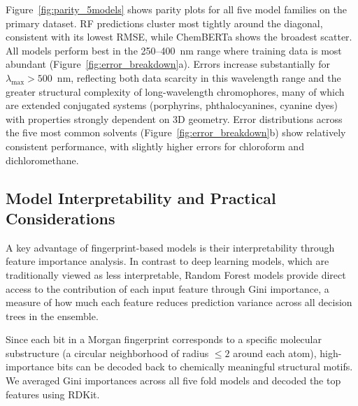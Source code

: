 Figure~\ref{fig:parity_5models} shows parity plots for all five model families on the primary dataset.
RF predictions cluster most tightly around the diagonal, consistent with its lowest RMSE, while ChemBERTa shows the broadest scatter.
All models perform best in the 250--400~nm range where training data is most abundant (Figure~\ref{fig:error_breakdown}a).
Errors increase substantially for $\lambda_{\max} > 500$~nm, reflecting both data scarcity in this wavelength range and the greater structural complexity of long-wavelength chromophores, many of which are extended conjugated systems (porphyrins, phthalocyanines, cyanine dyes) with properties strongly dependent on 3D geometry\cite{flemingMolecular2010}.
Error distributions across the five most common solvents (Figure~\ref{fig:error_breakdown}b) show relatively consistent performance, with slightly higher errors for chloroform and dichloromethane.


\subsection{Model Interpretability and Practical Considerations}
\label{sec:interpretability}

A key advantage of fingerprint-based models is their interpretability through feature importance analysis.
In contrast to deep learning models, which are traditionally viewed as less interpretable, Random Forest models provide direct access to the contribution of each input feature through Gini importance, a measure of how much each feature reduces prediction variance across all decision trees in the ensemble.

Since each bit in a Morgan fingerprint corresponds to a specific molecular substructure (a circular neighborhood of radius $\leq 2$ around each atom), high-importance bits can be decoded back to chemically meaningful structural motifs.
We averaged Gini importances across all five fold models and decoded the top features using RDKit.

